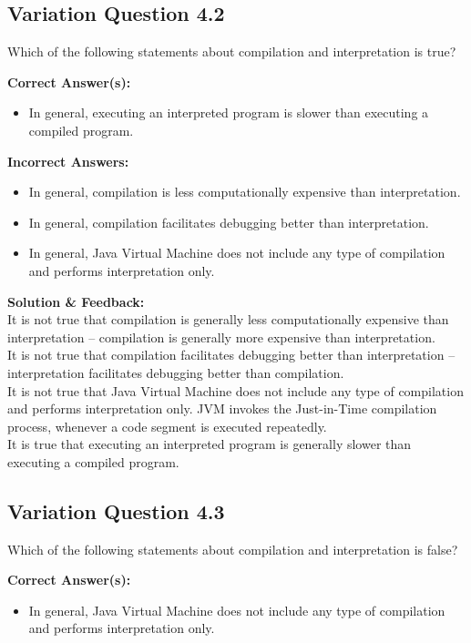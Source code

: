 \subsection{Variation Question 4.2}

Which of the following statements about compilation and interpretation is true?

\textbf{Correct Answer(s):}
\begin{itemize}
    \item In general, executing an interpreted program is slower than executing a compiled program.
\end{itemize}

\textbf{Incorrect Answers:}
\begin{itemize}
    \item In general, compilation is less computationally expensive than interpretation.
    \item In general, compilation facilitates debugging better than interpretation.
    \item In general, Java Virtual Machine does not include any type of compilation and performs interpretation only.
\end{itemize}

\textbf{Solution \& Feedback:}\\
It is not true that compilation is generally less computationally expensive than interpretation – compilation is generally more expensive than interpretation.\\
It is not true that compilation facilitates debugging better than interpretation – interpretation facilitates debugging better than compilation.\\
It is not true that Java Virtual Machine does not include any type of compilation and performs interpretation only. JVM invokes the Just-in-Time compilation process, whenever a code segment is executed repeatedly.\\
It is true that executing an interpreted program is generally slower than executing a compiled program.

\subsection{Variation Question 4.3}

Which of the following statements about compilation and interpretation is false?

\textbf{Correct Answer(s):}
\begin{itemize}
    \item In general, Java Virtual Machine does not include any type of compilation and performs interpretation only.
\end{itemize}

